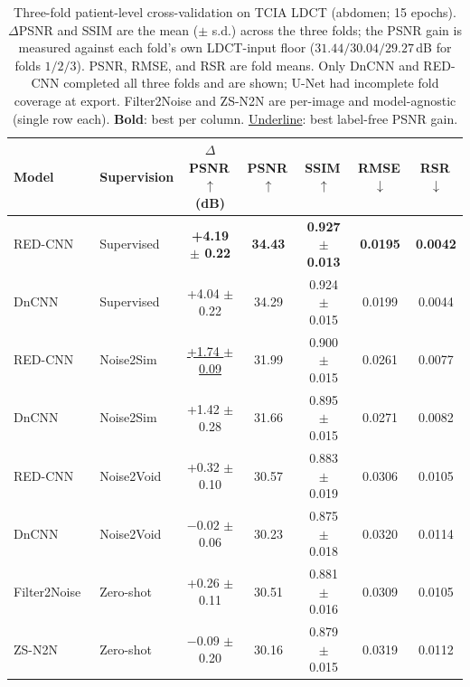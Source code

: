 \begin{table}[t]
  \centering
  \small
  \caption{Three-fold patient-level cross-validation on TCIA LDCT (abdomen;
           15 epochs).  $\Delta$PSNR and SSIM are the mean ($\pm$ s.d.) across
           the three folds; the PSNR gain is measured against each fold's own
           LDCT-input floor ($31.44/30.04/29.27$\,dB for folds $1/2/3$).  PSNR,
           RMSE, and RSR are fold means.  Only DnCNN and RED-CNN completed
           all three folds and are shown; U-Net had incomplete fold coverage at
           export.  Filter2Noise and ZS-N2N are per-image and model-agnostic
           (single row each).  \textbf{Bold}: best per column.
           \underline{Underline}: best label-free PSNR gain.}
  \label{tab:cv}
  \begin{tabular}{llccccc}
    \toprule
    \textbf{Model} & \textbf{Supervision} &
    $\Delta$PSNR\,$\uparrow$ (dB) & PSNR\,$\uparrow$ & SSIM\,$\uparrow$ &
    RMSE\,$\downarrow$ & RSR\,$\downarrow$ \\
    \midrule
    RED-CNN~\cite{chen2017lowdose} & Supervised & \textbf{+4.19 $\pm$ 0.22} & \textbf{34.43} & \textbf{0.927 $\pm$ 0.013} & \textbf{0.0195} & \textbf{0.0042} \\
    DnCNN~\cite{zhang2017beyond}   & Supervised & +4.04 $\pm$ 0.22 & 34.29 & 0.924 $\pm$ 0.015 & 0.0199 & 0.0044 \\
    \midrule
    RED-CNN~\cite{chen2017lowdose} & Noise2Sim~\cite{niu2020noise2sim} & \underline{+1.74 $\pm$ 0.09} & 31.99 & 0.900 $\pm$ 0.015 & 0.0261 & 0.0077 \\
    DnCNN~\cite{zhang2017beyond}   & Noise2Sim~\cite{niu2020noise2sim} & +1.42 $\pm$ 0.28 & 31.66 & 0.895 $\pm$ 0.015 & 0.0271 & 0.0082 \\
    \midrule
    RED-CNN~\cite{chen2017lowdose} & Noise2Void~\cite{krull2019noise2void} & +0.32 $\pm$ 0.10 & 30.57 & 0.883 $\pm$ 0.019 & 0.0306 & 0.0105 \\
    DnCNN~\cite{zhang2017beyond}   & Noise2Void~\cite{krull2019noise2void} & $-0.02$ $\pm$ 0.06 & 30.23 & 0.875 $\pm$ 0.018 & 0.0320 & 0.0114 \\
    \midrule
    Filter2Noise~\cite{sun2025filter2noise} & Zero-shot & +0.26 $\pm$ 0.11 & 30.51 & 0.881 $\pm$ 0.016 & 0.0309 & 0.0105 \\
    ZS-N2N~\cite{mansour2023zsn2n}          & Zero-shot & $-0.09$ $\pm$ 0.20 & 30.16 & 0.879 $\pm$ 0.015 & 0.0319 & 0.0112 \\
    \bottomrule
  \end{tabular}
\end{table}

